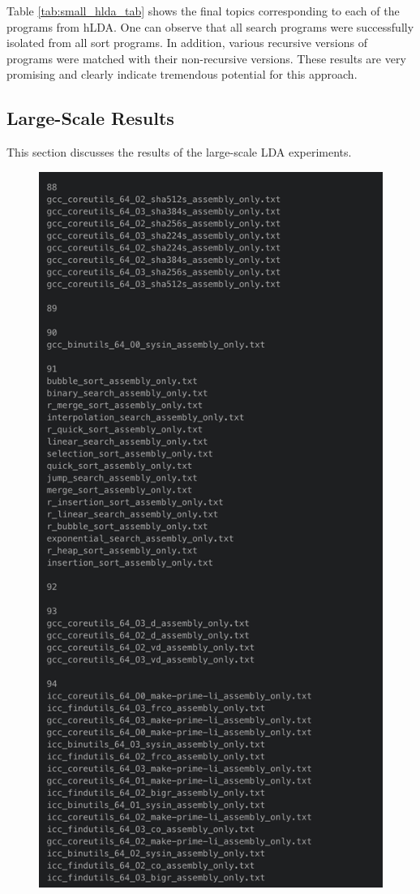 Table \ref{tab:small_hlda_tab} shows the final topics corresponding to each of the programs from hLDA. One can observe that all search programs were successfully isolated from all sort programs. In addition, various recursive versions of programs were matched with their non-recursive versions. These results are very promising and clearly indicate tremendous potential for this approach.

\subsection{Large-Scale Results}

This section discusses the results of the large-scale LDA experiments.

\begin{figure}
  \includegraphics[width=\linewidth]{./figures/large_lda_top_level.png}

\end{figure}
